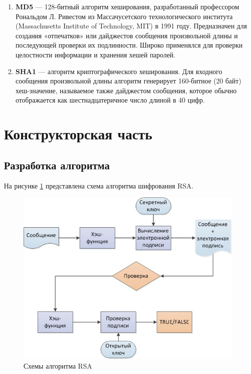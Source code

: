 \begin{enumerate}
	\item[1.] \textbf{MD5}  --- 128-битный алгоритм хеширования, разработанный профессором Рональдом Л. Ривестом из Массачусетского технологического института (Massachusetts Institute of Technology, MIT) в 1991 году. Предназначен для создания «отпечатков» или дайджестов сообщения произвольной длины и последующей проверки их подлинности. Широко применялся для проверки целостности информации и хранения хешей паролей.
	\item[2.] \textbf{SHA1} --- алгоритм криптографического хеширования. Для входного сообщения произвольной длины  алгоритм генерирует 160-битное (20 байт) хеш-значение, называемое также дайджестом сообщения, которое обычно отображается как шестнадцатеричное число длиной в 40 цифр.
\end{enumerate}

\clearpage

\section{Конструкторская часть}

\subsection{Разработка алгоритма}

На рисунке \ref{fig:algo} представлена схема алгоритма шифрования RSA.

%

\begin{figure}[h!]
	\centering
	\includegraphics[width=\textwidth]{assets/images/RSA.jpeg}
	\caption{Схемы алгоритма RSA}
	\label{fig:algo}
\end{figure}
\clearpage

